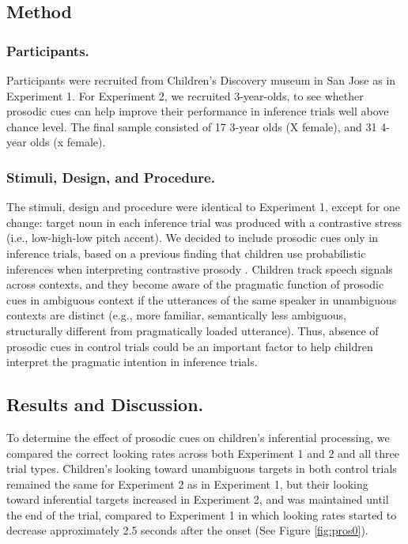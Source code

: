\documentclass[10pt,letterpaper]{article}
\begin{document}
\subsection{Method}

\subsubsection{Participants.}

Participants were recruited from Children's Discovery museum in San Jose as in Experiment 1. For Experiment 2, we recruited 3-year-olds, to see whether prosodic cues can help improve their performance in inference trials well above chance level. The final sample consisted of 17 3-year olds (X female), and 31 4-year olds (x female).

\subsubsection{Stimuli, Design, and Procedure.}

The stimuli, design and procedure were identical to Experiment 1, except for one change: target noun in each inference trial was produced with a contrastive stress (i.e., low-high-low pitch accent). We decided to include prosodic cues only in inference trials, based on a previous finding that children use probabilistic inferences when interpreting contrastive prosody \cite{kurumada1contextual}. Children track speech signals across contexts, and they become aware of the pragmatic function of prosodic cues in ambiguous context if the utterances of the same speaker in unambiguous contexts are distinct (e.g., more familiar, semantically less ambiguous, structurally different from pragmatically loaded utterance). Thus, absence of prosodic cues in control trials could be an important factor to help children interpret the pragmatic intention in inference trials.

\subsection{Results and Discussion.}

To determine the effect of prosodic cues on children's inferential processing, we compared the correct looking rates across both Experiment 1 and 2 and all three trial types. Children's looking toward unambiguous targets in both control trials remained the same for Experiment 2 as in Experiment 1, but their looking toward inferential targets increased in Experiment 2, and was maintained until the end of the trial, compared to Experiment 1 in which looking rates started to decrease approximately 2.5 seconds after the onset (See Figure \ref{fig:pros0}). 
\end{document}
